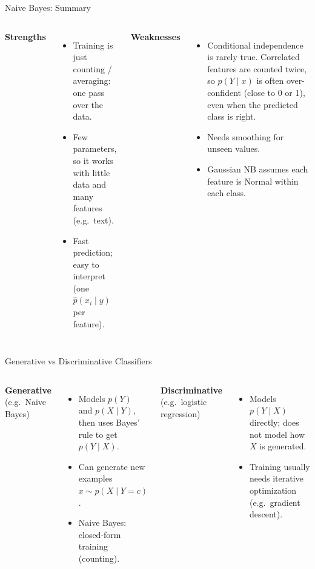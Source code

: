 \documentclass[aspectratio=169]{beamer}
\begin{document}
\begin{frame}{Naive Bayes: Summary}
\begin{columns}[t]
\textbf{Strengths}
\begin{itemize}
  \item Training is just counting / averaging: one pass over the data.
  \item Few parameters, so it works with little data and many features (e.g.\ text).
  \item Fast prediction; easy to interpret (one $\hat p(x_i\mid y)$ per feature).
\end{itemize}
\textbf{Weaknesses}
\begin{itemize}
  \item Conditional independence is rarely true. Correlated features are counted twice, so $p(Y\mid x)$ is often over-confident (close to 0 or 1), even when the predicted class is right.
  \item Needs smoothing for unseen values.
  \item Gaussian NB assumes each feature is Normal within each class.
\end{itemize}
\end{columns}
\end{frame}

\begin{frame}{Generative vs Discriminative Classifiers}
\begin{columns}[t]
\textbf{Generative} (e.g.\ Naive Bayes)
\begin{itemize}
  \item Models $p(Y)$ and $p(X\mid Y)$, then uses Bayes' rule to get $p(Y\mid X)$.
  \item Can generate new examples $x \sim p(X\mid Y=c)$.
  \item Naive Bayes: closed-form training (counting).
\end{itemize}
\textbf{Discriminative} (e.g.\ logistic regression)
\begin{itemize}
  \item Models $p(Y\mid X)$ directly; does not model how $X$ is generated.
  \item Training usually needs iterative optimization (e.g.\ gradient descent).
\end{itemize}
\end{columns}
\vspace{0.2cm}

\end{frame}
\end{document}

